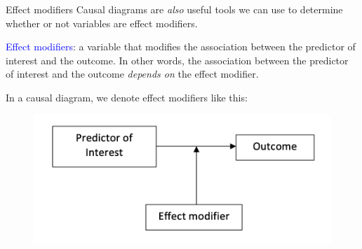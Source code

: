 \documentclass[10pt,t]{beamer}
\begin{document}
\begin{frame}{Effect modifiers}
Causal diagrams are \textit{also} useful tools we can use to determine whether or not variables are effect modifiers.

\vspace{0.3cm}

\textcolor{blue}{Effect modifiers}: a variable that modifies the association between the predictor of interest and the outcome. In other words, the association between the predictor of interest and the outcome \textit{depends on} the effect modifier. \pause

\vspace{0.3cm}

In a causal diagram, we denote effect modifiers like this:

\vspace{0.1cm}

\begin{figure}
	\centering \includegraphics[scale=0.4]{effectmod1.png}
\end{figure}
\end{frame}
\end{document}

